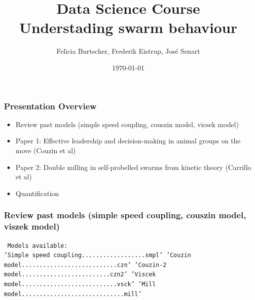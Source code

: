 \documentclass[compress]{beamer}
\title[Short title]{Data Science Course\\
\small{Understading swarm behaviour}}
\author[Grupo B4]{Felicia Burtscher, Frederik Eistrup, Jos\'{e} Senart\\  %
} %
\date{\today}
\institute[FUB]{\vspace{-10pt}Freie Universität Berlin}
\begin{document}
\begin{frame}
\titlepage
\end{frame}



\begin{frame}
  \frametitle{Presentation Overview}

  \begin{itemize}
  	\item Review past models (simple speed coupling, couszin model, vicsek model)
	\item Paper 1: Effective leadership and decision-making in animal groups on the move (Couzin et al)
	\item Paper 2: Double milling in self-probelled swarms from kinetic theory (Carrillo et al)
	\item Quantification
  \end{itemize}


\end{frame}

\begin{frame}
  \frametitle{Review past models (simple speed coupling, couszin model, viszek model)}
  
  
  \texttt{
  Models available:\\
  'Simple speed coupling..................smpl'
  'Couzin model...........................czn'
  'Couzin-2 model.........................czn2'
  'Viscek model...........................vsck'
  'Mill model.............................mill'
}
  
\end{frame}
\end{document}
